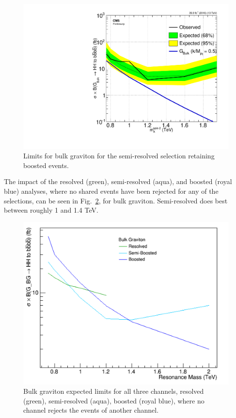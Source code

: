 \begin{figure}[thb!]
\begin{center}
\includegraphics[scale=0.5]{F5/brazilianFlag_2p1BGretain_HH4b2p1_HH4b2p1_13TeV.pdf}
\end{center}
\caption{Limits for bulk graviton for the semi-resolved selection retaining boosted events.}
\label{fig:BGblindnone}
\end{figure} 

The impact of the resolved (green), semi-resolved (aqua), and boosted (royal blue) analyses, where no shared events have been rejected for any of the selections, can be seen in Fig.~\ref{fig:limcompare}, for bulk graviton. Semi-resolved does best between roughly 1 and 1.4 TeV.
\begin{figure}
\centering
\includegraphics[scale=0.5]{F5/bg_compare.pdf}
\caption{Bulk graviton expected limits for all three channels, resolved (green), semi-resolved (aqua), boosted (royal blue), where no channel rejects the events of another channel.}
\label{fig:limcompare}
\end{figure}

